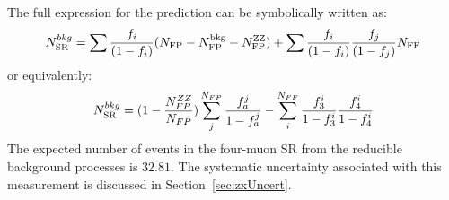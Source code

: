 The full expression for the prediction can be symbolically written as:
%
\begin{equation} 
\label{eq:PredictionSR}
N^{bkg}_{\rm SR} = \sum \frac{f_{i}}{(1-f_{i})} (N_{\rm FP} - N^{\rm
bkg}_{\rm FP} - N^{\rm ZZ}_{\rm FP})
+ \sum \frac{f_{i}}{(1-f_{i})} \frac{f_{j}}{(1-f_{j})}N_{\rm FF} \end{equation}
or equivalently:
\begin{equation}
\label{eq:PredictionSR2}
N^{bkg}_{\rm SR}= (1-\frac{N_{FP}^{ZZ}}{N_{FP}})\sum_j^{N_{FP}}\frac{f_a^j}{1-f_a^j} - \sum_i^{N_{FF}}\frac{f_3^i}{1-f_3^i}\frac{f_4^i}{1-f_4^i}
\end{equation}
The expected number of events in the four-muon SR from the reducible background processes is $32.81$. The systematic uncertainty associated with this measurement is discussed in Section~\ref{sec:zxUncert}.


